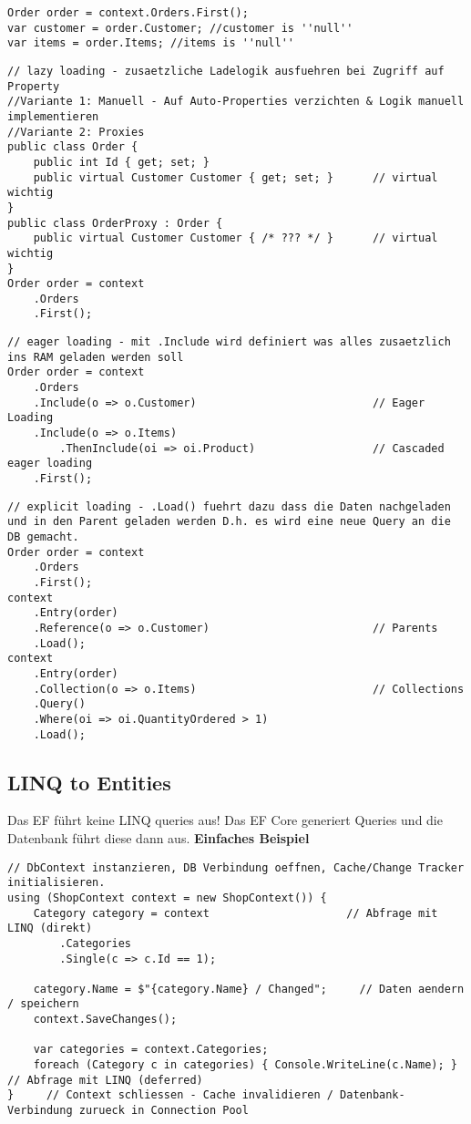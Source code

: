 \begin{lstlisting}
Order order = context.Orders.First();
var customer = order.Customer; //customer is ''null''
var items = order.Items; //items is ''null''
\end{lstlisting}

\begin{lstlisting}
// lazy loading - zusaetzliche Ladelogik ausfuehren bei Zugriff auf Property
//Variante 1: Manuell - Auf Auto-Properties verzichten & Logik manuell implementieren
//Variante 2: Proxies 
public class Order {
    public int Id { get; set; }
    public virtual Customer Customer { get; set; }      // virtual wichtig
}
public class OrderProxy : Order {
    public virtual Customer Customer { /* ??? */ }      // virtual wichtig
}
Order order = context
    .Orders
    .First();
\end{lstlisting}

\begin{lstlisting}
// eager loading - mit .Include wird definiert was alles zusaetzlich ins RAM geladen werden soll
Order order = context
    .Orders
    .Include(o => o.Customer)                           // Eager Loading
    .Include(o => o.Items)
        .ThenInclude(oi => oi.Product)                  // Cascaded eager loading
    .First();
\end{lstlisting}

\begin{lstlisting}
// explicit loading - .Load() fuehrt dazu dass die Daten nachgeladen und in den Parent geladen werden D.h. es wird eine neue Query an die DB gemacht.
Order order = context
    .Orders
    .First();
context
    .Entry(order)
    .Reference(o => o.Customer)                         // Parents
    .Load();
context
    .Entry(order)
    .Collection(o => o.Items)                           // Collections
    .Query()
    .Where(oi => oi.QuantityOrdered > 1)
    .Load();
\end{lstlisting}

\subsection{LINQ to Entities}
Das EF führt keine LINQ queries aus! Das EF Core generiert Queries und die Datenbank führt diese dann aus.
\textbf{Einfaches Beispiel}
\begin{lstlisting} 
// DbContext instanzieren, DB Verbindung oeffnen, Cache/Change Tracker initialisieren.
using (ShopContext context = new ShopContext()) {          
    Category category = context                     // Abfrage mit LINQ (direkt)
        .Categories
        .Single(c => c.Id == 1);
        
    category.Name = $"{category.Name} / Changed";     // Daten aendern / speichern 
    context.SaveChanges();
    
    var categories = context.Categories;
    foreach (Category c in categories) { Console.WriteLine(c.Name); }       // Abfrage mit LINQ (deferred)
}     // Context schliessen - Cache invalidieren / Datenbank-Verbindung zurueck in Connection Pool
\end{lstlisting}

